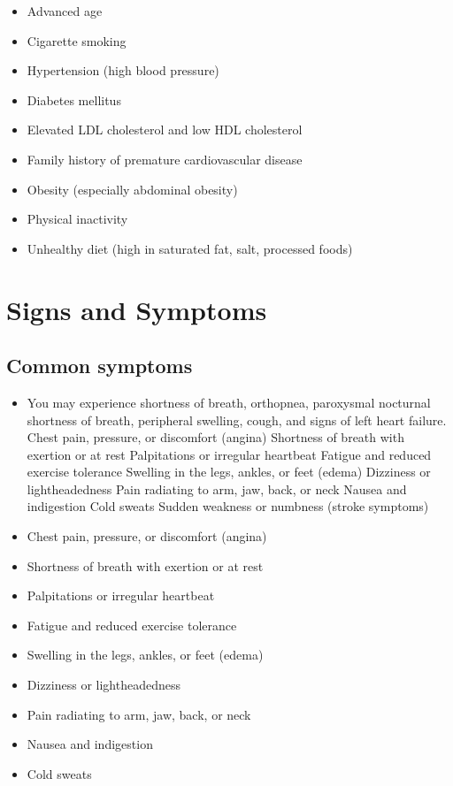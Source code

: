 \begin{itemize}[noitemsep]
  \item Advanced age
  \item Cigarette smoking
  \item Hypertension (high blood pressure)
  \item Diabetes mellitus
  \item Elevated LDL cholesterol and low HDL cholesterol
  \item Family history of premature cardiovascular disease
  \item Obesity (especially abdominal obesity)
  \item Physical inactivity
  \item Unhealthy diet (high in saturated fat, salt, processed foods)
\end{itemize}
\section{Signs and Symptoms}

\subsection{Common symptoms}
\begin{itemize}[noitemsep]
  \item You may experience shortness of breath, orthopnea, paroxysmal nocturnal shortness of breath, peripheral swelling, cough, and signs of left heart failure. Chest pain, pressure, or discomfort (angina) Shortness of breath with exertion or at rest Palpitations or irregular heartbeat Fatigue and reduced exercise tolerance Swelling in the legs, ankles, or feet (edema) Dizziness or lightheadedness Pain radiating to arm, jaw, back, or neck Nausea and indigestion Cold sweats Sudden weakness or numbness (stroke symptoms)
  \item Chest pain, pressure, or discomfort (angina)
  \item Shortness of breath with exertion or at rest
  \item Palpitations or irregular heartbeat
  \item Fatigue and reduced exercise tolerance
  \item Swelling in the legs, ankles, or feet (edema)
  \item Dizziness or lightheadedness
  \item Pain radiating to arm, jaw, back, or neck
  \item Nausea and indigestion
  \item Cold sweats
\end{itemize}

